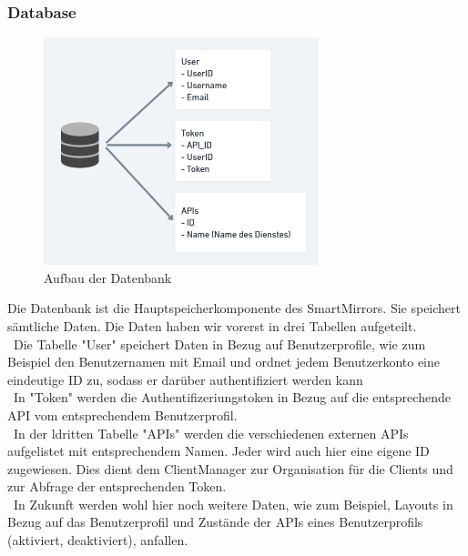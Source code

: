 \subsubsection{Database}
\begin{figure}[h]
\centering
\includegraphics[width=80mm]{pictures/Database.png}
\caption{Aufbau der Datenbank}
\end{figure}
Die Datenbank ist die Hauptspeicherkomponente des SmartMirrors. Sie speichert sämtliche Daten. Die Daten haben wir vorerst in drei Tabellen aufgeteilt.\\\
Die Tabelle "User" speichert Daten in Bezug auf Benutzerprofile, wie zum Beispiel den Benutzernamen mit Email und ordnet jedem Benutzerkonto eine eindeutige ID zu, sodass er darüber authentifiziert werden kann\\\
In "Token" werden die Authentifizeriungstoken in Bezug auf die entsprechende API vom entsprechendem Benutzerprofil.\\\
In der ldritten Tabelle "APIs" werden die verschiedenen externen APIs aufgelistet mit entsprechendem Namen. Jeder wird auch hier eine eigene ID zugewiesen. Dies dient dem ClientManager zur Organisation für die Clients und zur Abfrage der entsprechenden Token.\\\
In Zukunft werden wohl hier noch weitere Daten, wie zum Beispiel, Layouts in Bezug auf das Benutzerprofil und Zustände der APIs eines Benutzerprofils (aktiviert, deaktiviert), anfallen.

